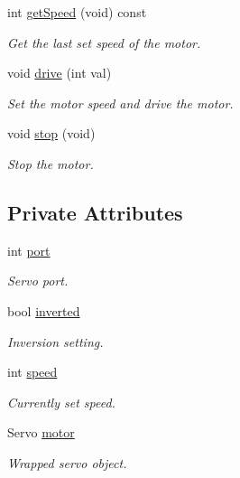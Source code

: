 \begin{DoxyCompactItemize}
int \hyperlink{class_v_e_x_motor_aa4b9bf46160a8fe41fd05910dab5db54}{get\+Speed} (void) const
\begin{DoxyCompactList}\small\item\em Get the last set speed of the motor. \end{DoxyCompactList}\item 
void \hyperlink{class_v_e_x_motor_ac8ab5c30e4be4a9e3ed290e7827bcf1a}{drive} (int val)
\begin{DoxyCompactList}\small\item\em Set the motor speed and drive the motor. \end{DoxyCompactList}\item 
void \hyperlink{class_v_e_x_motor_aed9dadedda6a075093f076921958e7ed}{stop} (void)
\begin{DoxyCompactList}\small\item\em Stop the motor. \end{DoxyCompactList}\end{DoxyCompactItemize}
\subsection*{Private Attributes}
\begin{DoxyCompactItemize}
\item 
int \hyperlink{class_v_e_x_motor_a4d116557bd4fd7149a498980369bace5}{port}
\begin{DoxyCompactList}\small\item\em Servo port. \end{DoxyCompactList}\item 
bool \hyperlink{class_v_e_x_motor_ae0059b010c3c3185c43918cec2c021e8}{inverted}
\begin{DoxyCompactList}\small\item\em Inversion setting. \end{DoxyCompactList}\item 
int \hyperlink{class_v_e_x_motor_a6ab8752bef90d706c107826a436afa24}{speed}
\begin{DoxyCompactList}\small\item\em Currently set speed. \end{DoxyCompactList}\item 
Servo \hyperlink{class_v_e_x_motor_a6cc23059af5cd57eafe31c900698d1a1}{motor}
\begin{DoxyCompactList}\small\item\em Wrapped servo object. \end{DoxyCompactList}\end{DoxyCompactItemize}


